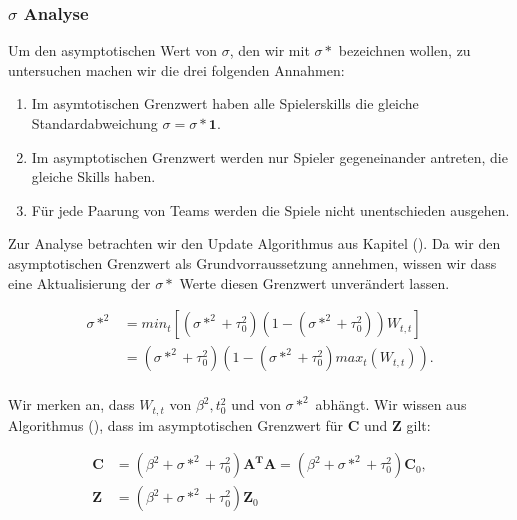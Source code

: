 \documentclass[12pt,a4paper]{scrartcl}
\numberwithin{equation}{section}
\begin{document}
   \subsubsection{$\sigma$ Analyse}
   
   Um den asymptotischen Wert von $\sigma$, den wir mit $\sigma*$ bezeichnen wollen, zu untersuchen machen wir die drei folgenden Annahmen: 
   
   \begin{enumerate}
    \item Im asymtotischen Grenzwert haben alle Spielerskills die gleiche Standardabweichung $\sigma = \sigma* \textbf{1}$.
    \item Im asymptotischen Grenzwert werden nur Spieler gegeneinander antreten, die gleiche Skills haben. 
    \item Für jede Paarung von Teams werden die Spiele nicht unentschieden ausgehen.
   \end{enumerate}
   
   Zur Analyse betrachten wir den Update Algorithmus aus Kapitel (). 
   Da wir den asymptotischen Grenzwert als Grundvorraussetzung annehmen, wissen wir dass eine Aktualisierung der $\sigma*$ Werte diesen Grenzwert unverändert lassen. 
   
   \begin{equation}
   \begin{split}
    \sigma*^2 &= min_t [(\sigma*^2 + \tau_0^2) (1- (\sigma*^2 + \tau_0^2)) W_{t,t}] \\
    &= (\sigma*^2 + \tau_0^2)(1-(\sigma*^2 + \tau_0^2) max_t(W_{t,t})). \\
    \end{split}
   \end{equation}
   
   Wir merken an, dass $W_{t,t}$ von $\beta^2, t_0^2$ und von $\sigma*^2$ abhängt. Wir wissen aus Algorithmus (), dass im asymptotischen Grenzwert für $\mathbf{C}$ und $\mathbf{Z}$
   gilt:
   
   \begin{equation}
    \begin{split}
      \mathbf{C} &= (\beta^2 + \sigma*^2 + \tau_0^2) \mathbf{A^T} \mathbf{A} = (\beta^2 + \sigma*^2 + \tau_0^2) \mathbf{C}_0, \\
      \mathbf{Z} &= (\beta^2 + \sigma*^2 + \tau_0^2) \mathbf{Z}_0 \\
    \end{split}
   \end{equation}
   
\end{document}
